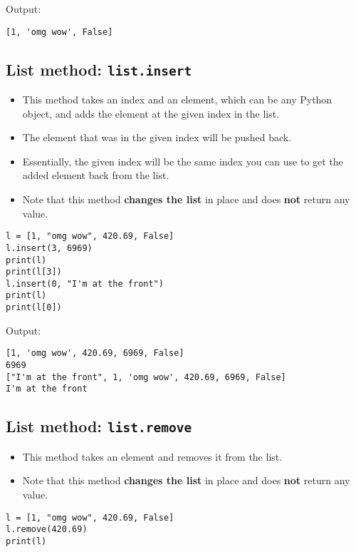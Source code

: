 \documentclass[11pt]{article}
\begin{document}
 \noindent Output:

\begin{verbatim}
[1, 'omg wow', False]
\end{verbatim}

\subsection{List method: \texttt{list.insert}}
\label{sec:orga9eae27}
\begin{itemize}
\item This method takes an index and an element, which can be any Python object, and adds the element at the given index in the list.
\item The element that was in the given index will be pushed back.
\item Essentially, the given index will be the same index you can use to get the added element back from the list.
\item Note that this method \textbf{changes the list} in place and does \textbf{not} return any value.
\end{itemize}

\begin{verbatim}
l = [1, "omg wow", 420.69, False]
l.insert(3, 6969)
print(l)
print(l[3])
l.insert(0, "I'm at the front")
print(l)
print(l[0])
\end{verbatim}

 \noindent Output:

\begin{verbatim}
[1, 'omg wow', 420.69, 6969, False]
6969
["I'm at the front", 1, 'omg wow', 420.69, 6969, False]
I'm at the front
\end{verbatim}

\subsection{List method: \texttt{list.remove}}
\label{sec:orgf925fdc}
\begin{itemize}
\item This method takes an element and removes it from the list.
\item Note that this method \textbf{changes the list} in place and does \textbf{not} return any value.
\end{itemize}

\begin{verbatim}
l = [1, "omg wow", 420.69, False]
l.remove(420.69)
print(l)
\end{verbatim}
\end{document}
